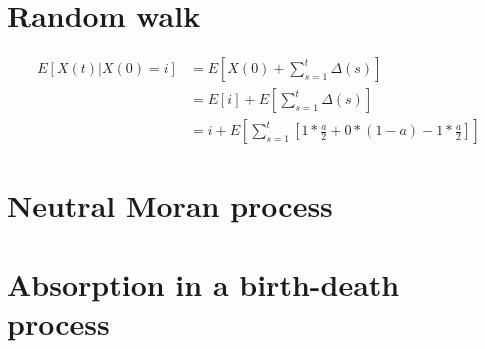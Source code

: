 \setcounter{chapter}{3}
\setcounter{section}{0}
\section{Random walk}

\begin{align*}
E[X(t) | X(0)  = i ] &= E[X(0) + \sum\limits_{s=1}^{t} \Delta(s) ] \\
&= E[i] + E\left[  \sum\limits_{s=1}^{t} \Delta(s) \right] \\
&= i + E \left[ \sum\limits_{s=1}^{t} \left[1 * \frac{a}{2} + 0 * (1-a) -1*\frac{a}{2}\right] \right]
\end{align*}


\setcounter{chapter}{4}
\setcounter{section}{0}
\section{Neutral Moran process}


\setcounter{chapter}{5}
\setcounter{section}{0}
\section{Absorption in a birth-death process}

